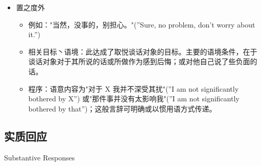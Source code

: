 \begin{itemize}
\begin{itemize}
\end{itemize}
\item 置之度外
\begin{itemize}
\item 例如："当然，没事的，别担心。"(”Sure, no problem, don’t worry about it.”)
\item 相关目标丶语境：此达成了取悦谈话对象的目标。主要的语境条件，在于谈话对象对于其所说的话或所做作为感到后悔；或对他自己说了些负面的话。 
\item 程序：语意内容为"对于 X 我并不深受其扰"(”I am not significantly bothered by X”) 或"那件事并没有太影响我"(”I am not significantly bothered by that”)；这般言辞可明确或以惯用语方式传递。
\end{itemize}
\end{itemize}

\subsection{实质回应}{Substantive Responses}
